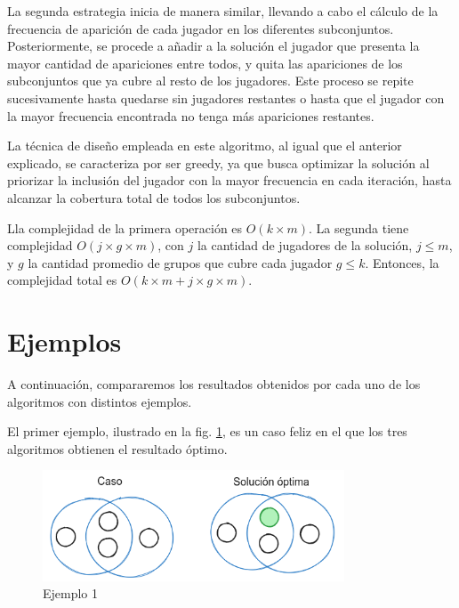 La segunda estrategia inicia de manera similar, llevando a cabo el cálculo de la frecuencia de aparición de cada jugador en los diferentes subconjuntos. Posteriormente, se procede a añadir a la solución el jugador que presenta la mayor cantidad de apariciones entre todos, y quita las apariciones de los subconjuntos que ya cubre al resto de los jugadores. Este proceso se repite sucesivamente hasta quedarse sin jugadores restantes o hasta que el jugador con la mayor frecuencia encontrada no tenga más apariciones restantes.

La técnica de diseño empleada en este algoritmo, al igual que el anterior explicado, se caracteriza por ser greedy, ya que busca optimizar la solución al priorizar la inclusión del jugador con la mayor frecuencia en cada iteración, hasta alcanzar la cobertura total de todos los subconjuntos. 



Lla complejidad de la primera operación es $O(k \times m)$. La segunda tiene complejidad $O(j \times g \times m)$, con $j$ la cantidad de jugadores de la solución, $j \leq m$, y $g$ la cantidad promedio de grupos que cubre cada jugador $g \leq k$. Entonces, la complejidad total es $O(k \times m + j \times g \times m)$. %

\section{Ejemplos}

A continuación, compararemos los resultados obtenidos por cada uno de los algoritmos con distintos ejemplos.

El primer ejemplo, ilustrado en la fig. \ref{fig:greedy_ej1}, es un caso feliz en el que los tres algoritmos obtienen el resultado óptimo.

\begin{figure}[H]
    \centering
    \includegraphics[width=0.8\textwidth]{img/greedy_ej1.png}
    \caption{Ejemplo 1}
    \label{fig:greedy_ej1}
\end{figure}

